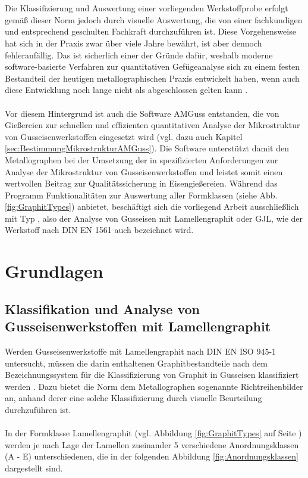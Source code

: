\documentclass[
fontsize=10pt, 
listof = totoc,
parskip = half	
]{report}
\newcommand{\uproman}[1]{\uppercase\expandafter{\romannumeral#1}}
\begin{document}
\\\\
Die Klassifizierung und Auswertung einer vorliegenden Werkstoffprobe erfolgt gemäß dieser Norm jedoch durch visuelle Auswertung, die von einer fachkundigen und entsprechend geschulten Fachkraft durchzuführen ist. Diese Vorgehensweise hat sich in der Praxis zwar über viele Jahre bewährt, ist aber dennoch fehleranfällig. Das ist sicherlich einer der Gründe dafür, weshalb moderne software-basierte Verfahren zur quantitativen Gefügeanalyse sich zu einem festen Bestandteil der heutigen metallographischen Praxis entwickelt haben, wenn auch diese Entwicklung noch lange nicht als abgeschlossen gelten kann \cite{schumann_oettel_2016}.
\\\\
Vor diesem Hintergrund ist auch die Software AMGuss entstanden, die von Gießereien zur schnellen und effizienten quantitativen Analyse der Mikrostruktur von Gusseisenwerkstoffen eingesetzt wird (vgl. dazu auch Kapitel \ref{sec:BestimmungMikrostrukturAMGuss}). Die Software  unterstützt  damit den Metallographen bei der Umsetzung der in \cite{ISO945} spezifizierten Anforderungen zur Analyse der Mikrostruktur von Gusseisenwerkstoffen und leistet somit einen wertvollen Beitrag zur Qualitätssicherung in Eisengießereien. Während das Programm Funktionalitäten zur Auswertung aller Formklassen (siehe Abb. \ref{fig:GraphitTypes}) anbietet, beschäftigt sich die vorliegend Arbeit ausschließlich mit Typ \uproman{1}, also der Analyse von Gusseisen mit Lamellengraphit oder GJL, wie der Werkstoff nach DIN EN 1561 auch bezeichnet wird. 




\chapter{Grundlagen}
\label{ch:Grundlagen}

\section{Klassifikation und Analyse von Gusseisenwerkstoffen mit Lamellengraphit}
\label{subsec:MethodenBestAnordnungsklassen}
Werden Gusseisenwerkstoffe mit Lamellengraphit nach DIN EN ISO 945-1 untersucht, müssen die darin enthaltenen Graphitbestandteile nach dem Bezeichnungssystem für die Klassifizierung von Graphit in Gusseisen klassifiziert  werden \cite[Seite 6]{ISO945}. Dazu bietet die Norm dem Metallographen sogenannte Richtreihenbilder an, anhand derer eine solche Klassifizierung durch visuelle Beurteilung durchzuführen ist.
\\\\
In der Formklasse Lamellengraphit (vgl. Abbildung \ref{fig:GraphitTypes} auf Seite \pageref{fig:GraphitTypes}) werden je nach Lage der Lamellen zueinander 5 verschiedene Anordnungsklassen (A - E) unterschiedenen, die in der folgenden Abbildung \ref{fig:Anordnungsklassen} dargestellt sind.
\end{document}
